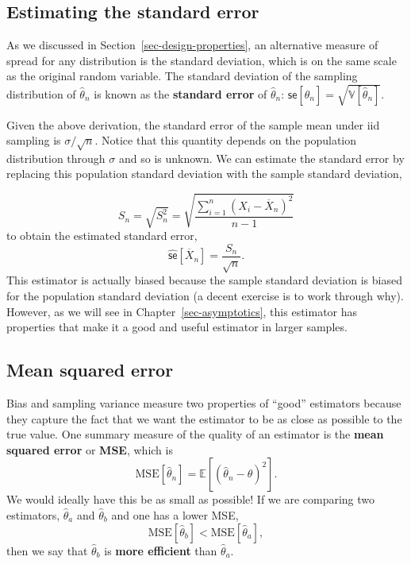 \documentclass[
  13pt,
  letterpaper,
  DIV=11,
  numbers=noendperiod]{scrreprt}
\newcommand{\E}{\mathbb{E}}
\newcommand{\V}{\mathbb{V}}
\newcommand{\se}{\textsf{se}}
\newcommand{\Xbar}{\overline{X}}
\theoremstyle{plain}
\theoremstyle{plain}
\theoremstyle{definition}
\theoremstyle{definition}
\theoremstyle{remark}
\begin{document}
\subsection{Estimating the standard
error}\label{estimating-the-standard-error}

As we discussed in Section~\ref{sec-design-properties}, an alternative
measure of spread for any distribution is the standard deviation, which
is on the same scale as the original random variable. The standard
deviation of the sampling distribution of \(\widehat{\theta}_n\) is
known as the \textbf{standard error} of \(\widehat{\theta}_n\):
\(\se[\widehat{\theta}_n]= \sqrt{\V[\widehat{\theta}_n]}\).

Given the above derivation, the standard error of the sample mean under
iid sampling is \(\sigma / \sqrt{n}\). Notice that this quantity depends
on the population distribution through \(\sigma\) and so is unknown. We
can estimate the standard error by replacing this population standard
deviation with the sample standard deviation,

\[
S_n = \sqrt{S_n^2} = \sqrt{\frac{\sum_{i=1}^n (X_i - \Xbar_n)^2}{n-1}}
\] to obtain the estimated standard error, \[
\widehat{\se}[\Xbar_n] = \frac{S_n}{\sqrt{n}}.
\] This estimator is actually biased because the sample standard
deviation is biased for the population standard deviation (a decent
exercise is to work through why). However, as we will see in
Chapter~\ref{sec-asymptotics}, this estimator has properties that make
it a good and useful estimator in larger samples.

\subsection{Mean squared error}\label{mean-squared-error}

Bias and sampling variance measure two properties of ``good'' estimators
because they capture the fact that we want the estimator to be as close
as possible to the true value. One summary measure of the quality of an
estimator is the \textbf{mean squared error} or \textbf{MSE}, which is
\[
\text{MSE}[\widehat{\theta}_n] = \E[(\widehat{\theta}_n-\theta)^2].
\] We would ideally have this be as small as possible! If we are
comparing two estimators, \(\widehat{\theta}_a\) and
\(\widehat{\theta}_b\) and one has a lower MSE, \[
\text{MSE}[\widehat{\theta}_b] < \text{MSE}[\widehat{\theta}_a],
\] then we say that \(\widehat{\theta}_b\) is \textbf{more efficient}
than \(\widehat{\theta}_a\).
\end{document}
